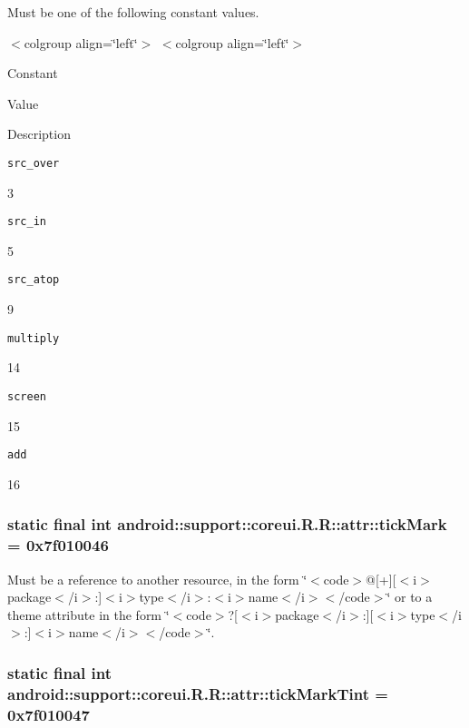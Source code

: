 Must be one of the following constant values. \begin{TabularC}{0}
\hline
\end{TabularC}
$<$colgroup align=\char`\"{}left\char`\"{}$>$ $<$colgroup align=\char`\"{}left\char`\"{}$>$ 

Constant

Value

Description 

{\tt src\_\-over}

3

{\tt src\_\-in}

5

{\tt src\_\-atop}

9

{\tt multiply}

14

{\tt screen}

15

{\tt add}

16\hypertarget{classandroid_1_1support_1_1coreui_1_1_r_1_1attr_486084c0f15854d6ea69981ec7115fe2}{
\subsubsection[{tickMark}]{\setlength{\rightskip}{0pt plus 5cm}static final int android::support::coreui.R.R::attr::tickMark = 0x7f010046}}
\label{classandroid_1_1support_1_1coreui_1_1_r_1_1attr_486084c0f15854d6ea69981ec7115fe2}


Must be a reference to another resource, in the form \char`\"{}$<$code$>$@\mbox{[}+\mbox{]}\mbox{[}$<$i$>$package$<$/i$>$:\mbox{]}$<$i$>$type$<$/i$>$:$<$i$>$name$<$/i$>$$<$/code$>$\char`\"{} or to a theme attribute in the form \char`\"{}$<$code$>$?\mbox{[}$<$i$>$package$<$/i$>$:\mbox{]}\mbox{[}$<$i$>$type$<$/i$>$:\mbox{]}$<$i$>$name$<$/i$>$$<$/code$>$\char`\"{}. \hypertarget{classandroid_1_1support_1_1coreui_1_1_r_1_1attr_9a9caf141a86c599469281f66c24b532}{
\subsubsection[{tickMarkTint}]{\setlength{\rightskip}{0pt plus 5cm}static final int android::support::coreui.R.R::attr::tickMarkTint = 0x7f010047}}
\label{classandroid_1_1support_1_1coreui_1_1_r_1_1attr_9a9caf141a86c599469281f66c24b532}


